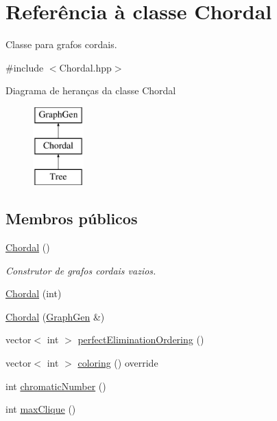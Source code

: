 \hypertarget{classChordal}{}\section{Referência à classe Chordal}
\label{classChordal}


Classe para grafos cordais.  




{\ttfamily \#include $<$Chordal.\+hpp$>$}

Diagrama de heranças da classe Chordal\begin{figure}[H]
\begin{center}
\leavevmode
\includegraphics[height=3.000000cm]{classChordal}
\end{center}
\end{figure}
\subsection*{Membros públicos}
\begin{DoxyCompactItemize}
\item 
\mbox{\label{classChordal_ab20403cdb91238d6576d0e757ae4c8f3}} 
\hyperlink{classChordal_ab20403cdb91238d6576d0e757ae4c8f3}{Chordal} ()
\begin{DoxyCompactList}\small\item\em Construtor de grafos cordais vazios. \end{DoxyCompactList}\item 
\hyperlink{classChordal_af315e26462665f1881975cc27372a67a}{Chordal} (int)
\item 
\hyperlink{classChordal_a6ab51b523f1b150560fcae74db9eee68}{Chordal} (\hyperlink{classGraphGen}{Graph\+Gen} \&)
\item 
vector$<$ int $>$ \hyperlink{classChordal_a45b66b1ee19a628646d83613d337d94a}{perfect\+Elimination\+Ordering} ()
\item 
vector$<$ int $>$ \hyperlink{classChordal_acac4822a1eb3376c29f3d193baaec91f}{coloring} () override
\item 
int \hyperlink{classChordal_ad7e9a3c8bd7f66ad4ddc6221523e6b12}{chromatic\+Number} ()
\item 
int \hyperlink{classChordal_aa19bddaef6b83d8bdb98993cf04929b7}{max\+Clique} ()
\end{DoxyCompactItemize}
